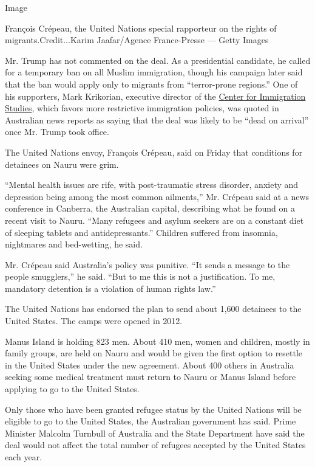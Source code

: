 Image

François Crépeau, the United Nations special rapporteur on the rights of
migrants.Credit...Karim Jaafar/Agence France-Presse --- Getty Images

Mr. Trump has not commented on the deal. As a presidential candidate, he
called for a temporary ban on all Muslim immigration, though his
campaign later said that the ban would apply only to migrants from
``terror-prone regions.'' One of his supporters, Mark Krikorian,
executive director of the \href{http://cis.org/}{Center for Immigration
Studies}, which favors more restrictive immigration policies, was quoted
in Australian news reports as saying that the deal was likely to be
``dead on arrival'' once Mr. Trump took office.

The United Nations envoy, François Crépeau, said on Friday that
conditions for detainees on Nauru were grim.

``Mental health issues are rife, with post-traumatic stress disorder,
anxiety and depression being among the most common ailments,'' Mr.
Crépeau said at a news conference in Canberra, the Australian capital,
describing what he found on a recent visit to Nauru. ``Many refugees and
asylum seekers are on a constant diet of sleeping tablets and
antidepressants.'' Children suffered from insomnia, nightmares and
bed-wetting, he said.

Mr. Crépeau said Australia's policy was punitive. ``It sends a message
to the people smugglers,'' he said. ``But to me this is not a
justification. To me, mandatory detention is a violation of human rights
law.''

The United Nations has endorsed the plan to send about 1,600 detainees
to the United States. The camps were opened in 2012.

Manus Island is holding 823 men. About 410 men, women and children,
mostly in family groups, are held on Nauru and would be given the first
option to resettle in the United States under the new agreement. About
400 others in Australia seeking some medical treatment must return to
Nauru or Manus Island before applying to go to the United States.

Only those who have been granted refugee status by the United Nations
will be eligible to go to the United States, the Australian government
has said. Prime Minister Malcolm Turnbull of Australia and the State
Department have said the deal would not affect the total number of
refugees accepted by the United States each year.

